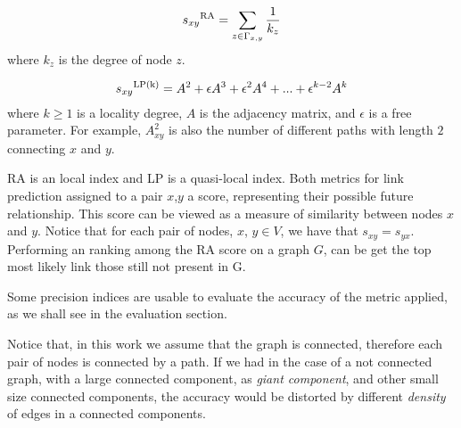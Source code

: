 \begin{equation}
\label{eqn:resource-allocation}
s_{xy}\textsuperscript{RA} = 
\sum\limits_{z\in\Gamma_{x,y}}\frac{1}{k_{z}}
\end{equation}
where $k_{z}$ is the degree of node $z$.

\begin{equation}
\label{eqn:local-path}
s_{xy}\textsuperscript{LP(k)} = 
A^{2} + \epsilon A^{3} + \epsilon^{2}A^{4}+...+\epsilon^{k-2}A^{k}
\end{equation}
where $k\geq 1$ is a locality degree, $A$ is the adjacency matrix, and $\epsilon$ is a free parameter. For example, $A_{xy}^{2}$ is also the number of different paths with length $2$ connecting $x$ and $y$.

RA is an local index and LP is a quasi-local index. Both metrics for link prediction assigned to a pair $x$,$y$ a score, representing their possible future relationship. This score can be viewed as a measure of similarity between nodes $x$ and $y$. Notice that for each pair of nodes, $x$, $y \in V$, we have that $s_{xy} = s_{yx}$. Performing an ranking among the RA score on a graph $G$, can be get the top most likely link those still not present in G.

Some precision indices are usable to evaluate the accuracy of the metric applied, as we shall see in the evaluation section.

Notice that, in this work we assume that the graph is connected, therefore each pair of nodes is connected by a path. If we had in the case of a not connected graph, with a large connected component, as \textit{giant component}, and other small size connected components, the accuracy would be distorted by different \textit{density} of edges in a connected components.

